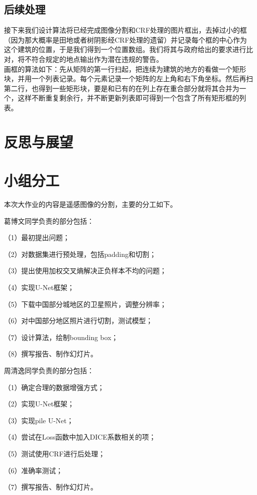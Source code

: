 \documentclass[a4paper,12pt]{article}
\begin{document}
\begin{CJK*}{UTF8}{gbsn}
\begin{spacing}{1.2}
    \subsection{后续处理}
    接下来我们设计算法将已经完成图像分割和CRF处理的图片框出，去掉过小的框（因为那大概率是田地或者树阴影经CRF处理的遗留）并记录每个框的中心作为这个建筑的位置，于是我们得到一个位置数组。我们将其与政府给出的要求进行比对，将不符合规定的地点输出作为潜在违规的警告。\\
    画框的算法如下：先从矩阵的第一行扫起，把连续为建筑的地方的看做一个矩形块，并用一个列表记录。每个元素记录一个矩阵的左上角和右下角坐标。然后再扫第二行，也得到一些矩形块，要是和已有的在列上存在重合部分就将其合并为一个，这样不断重复剩余行，并不断更新列表即可得到一个包含了所有矩形框的列表。

    


    \section{反思与展望}
    
    
    \section{小组分工}
    本次大作业的内容是遥感图像的分割，主要的分工如下。
    
    葛博文同学负责的部分包括：
    
    （1）最初提出问题；
    
    （2）对数据集进行预处理，包括padding和切割；
    
    （3）提出使用加权交叉熵解决正负样本不均的问题；
    
    （4）实现U-Net框架；
    
    （5）下载中国部分城地区的卫星照片，调整分辨率；
    
    （6）对中国部分地区照片进行切割，测试模型；
    
    （7）设计算法，绘制bounding box；
    
    （8）撰写报告、制作幻灯片。
    
    周清逸同学负责的部分包括：
    
    （1）确定合理的数据增强方式；
    
    （2）实现U-Net框架；
    
    （3）实现pile U-Net；
    
    （4）尝试在Loss函数中加入DICE系数相关的项；
    
    （5）测试使用CRF进行后处理；
    
    （6）准确率测试；
    
    （7）撰写报告、制作幻灯片。





    
    
    
\end{spacing}
\end{CJK*}
\end{document}
